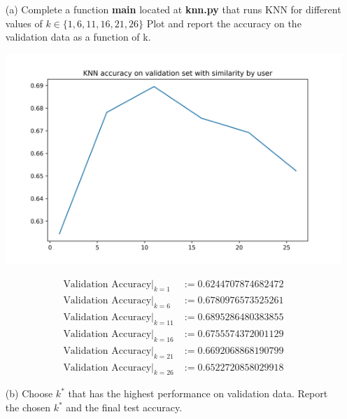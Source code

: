 \begin{itemize}
	\item [(a)] Complete a function \textbf{main} located at \textbf{knn.py} that runs KNN for different values of $k \in \{1, 6, 11, 16, 21, 26\}$ Plot and report the accuracy on the validation data as a function of k.
	\begin{center}
		\includegraphics[scale=0.8]{../out/KNN_user.jpg}
	\end{center}
	\begin{align*}
		\text{Validation Accuracy} \mid_{k=1} &:= 0.6244707874682472\\
		\text{Validation Accuracy} \mid_{k=6} &:=0.6780976573525261 \\
		\text{Validation Accuracy} \mid_{k=11} &:= 0.6895286480383855\\
		\text{Validation Accuracy} \mid_{k=16} &:=0.6755574372001129 \\
		\text{Validation Accuracy} \mid_{k=21} &:= 0.6692068868190799\\
		\text{Validation Accuracy} \mid_{k=26} &:= 0.6522720858029918
	\end{align*}

	\item [(b)] Choose $k^*$ that has the highest performance on validation data. Report the chosen $k^*$ and the final test accuracy.
	

\end{itemize}
